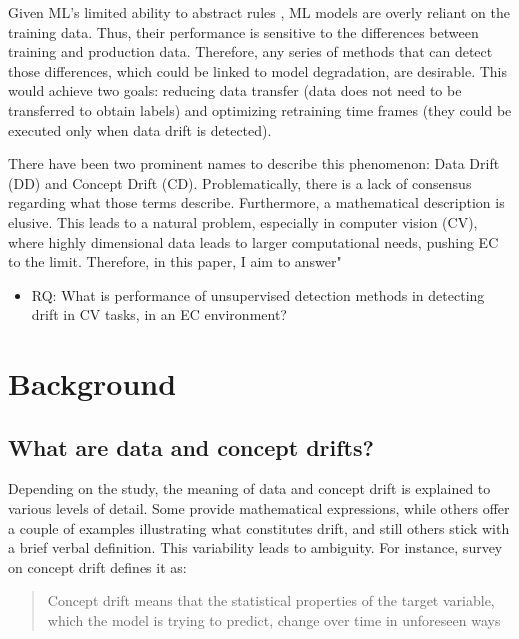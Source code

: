 \documentclass[a4paper]{article}
\begin{document}
Given ML's limited ability to abstract rules \cite{johnston_abstract_2023} \cite{marcus_deep_2018}, ML models are overly reliant on the training data. Thus, their performance is sensitive to the differences between training and production data. Therefore, any series of methods that can detect those differences, which could be linked to model degradation, are desirable. This would achieve two goals: reducing data transfer (data does not need to be transferred to obtain labels) and optimizing retraining time frames (they could be executed only when data drift is detected).

There have been two prominent names to describe this phenomenon: Data Drift (DD) and Concept Drift (CD). Problematically, there is a lack of consensus regarding what those terms describe. Furthermore, a mathematical description is elusive. This leads to a natural problem, especially in computer vision (CV), where highly dimensional data leads to larger computational needs, pushing EC to the limit. Therefore, in this paper, I aim to answer"

\begin{itemize}
    \item RQ: What is performance of unsupervised detection methods in detecting drift in CV tasks, in an EC environment?
\end{itemize}

\section{Background} %
\label{sec:background}

\subsection{What are data and concept drifts?}

Depending on the study, the meaning of data and concept drift is explained to various levels of detail. Some provide mathematical expressions, while others offer a couple of examples illustrating what constitutes drift, and still others stick with a brief verbal definition. This variability leads to ambiguity. For instance, \cite{lu_learning_2018} survey on concept drift defines it as:
\begin{quote}
    Concept drift means that the statistical properties of the target variable, which the model is trying to predict, change over time in unforeseen ways
\end{quote}
\end{document}
